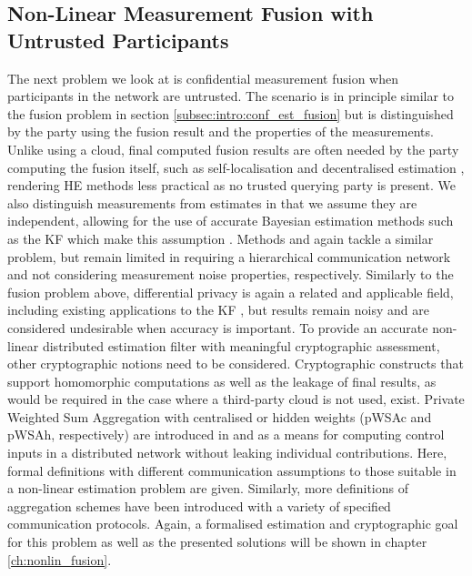 \subsection{Non-Linear Measurement Fusion with Untrusted Participants}\label{subsec:intro:conf_nonlin_measurements}
The next problem we look at is confidential measurement fusion when participants in the network are untrusted. The scenario is in principle similar to the fusion problem in section \ref{subsec:intro:conf_est_fusion} but is distinguished by the party using the fusion result and the properties of the measurements. Unlike using a cloud, final computed fusion results are often needed by the party computing the fusion itself, such as self-localisation and decentralised estimation \cite{sridharCooperativePerceptionAutonomous2019,grimeDataFusionDecentralized1994,pintoSelflocalisationIndoorMobile2013}, rendering HE methods less practical as no trusted querying party is present. We also distinguish measurements from estimates in that we assume they are independent, allowing for the use of accurate Bayesian estimation methods such as the KF which make this assumption \cite{haugBayesianEstimationTracking2012}. Methods \cite{aristovEncryptedMultisensorInformation2018} and \cite{alanwarPrOLocResilientLocalization2017} again tackle a similar problem, but remain limited in requiring a hierarchical communication network and not considering measurement noise properties, respectively. Similarly to the fusion problem above, differential privacy \cite{dworkDifferentialPrivacySurvey2008} is again a related and applicable field, including existing applications to the KF \cite{lenyDifferentiallyPrivateFiltering2014}, but results remain noisy and are considered undesirable when accuracy is important. To provide an accurate non-linear distributed estimation filter with meaningful cryptographic assessment, other cryptographic notions need to be considered. Cryptographic constructs that support homomorphic computations as well as the leakage of final results, as would be required in the case where a third-party cloud is not used, exist. Private Weighted Sum Aggregation with centralised or hidden weights (pWSAc and pWSAh, respectively) are introduced in \cite{schulzedarupEncryptedCooperativeControl2019} and \cite{alexandruPrivateWeightedSum2022} as a means for computing control inputs in a distributed network without leaking individual contributions. Here, formal definitions with different communication assumptions to those suitable in a non-linear estimation problem are given. Similarly, more definitions of aggregation schemes have been introduced \cite{shiPrivacyPreservingAggregationTimeSeries2011,joyeScalableSchemePrivacyPreserving2013,benhamoudaNewFrameworkPrivacyPreserving2016,darcoProbabilisticSecretSharing2018,beckerRevisitingPrivateStream2018,chanPrivacyPreservingStreamAggregation2012} with a variety of specified communication protocols. Again, a formalised estimation and cryptographic goal for this problem as well as the presented solutions will be shown in chapter \ref{ch:nonlin_fusion}.


